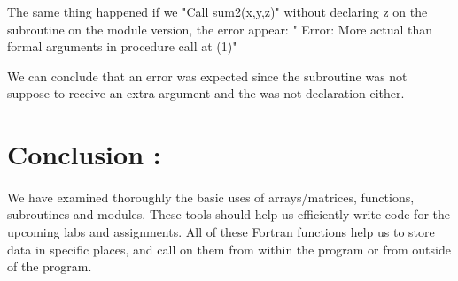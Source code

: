 \documentclass[twocolumn]{article}
\begin{document}
\subsubsection{}
\paragraph*{}
The same thing happened if we "Call sum2(x,y,z)" without declaring z on the subroutine on the module version, the error appear:
" Error: More actual than formal arguments in procedure call at (1)"

We can conclude that an error was expected since the subroutine was not suppose to receive an extra argument and the was not declaration either.
\section{Conclusion :}
\paragraph*{}
We have examined thoroughly the basic uses of arrays/matrices, functions, subroutines and modules. These tools should help us efficiently write code for the upcoming labs and assignments. All of these Fortran functions help us to store data in specific places, and call on them from within the program or from outside of the program.
\end{document}

